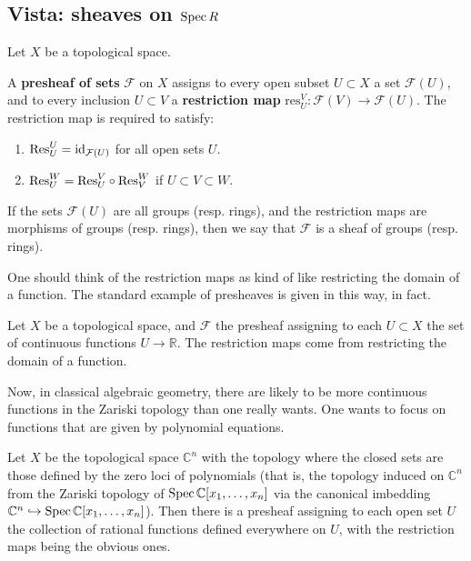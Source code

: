 \subsection{Vista: sheaves on $\operatorname{Spec} R$}

Let $X$ be a topological space. 
\begin{definition} 
A \textbf{presheaf of sets} $\mathcal{F}$ on $X$ assigns to every open subset
$U \subset X$ a set $\mathcal{F} (U)$, and to every inclusion $U \subset V$ a
\textbf{restriction map}
$\mathrm{res}^V_U : \mathcal{F}(V) \to \mathcal{F}(U)$. The restriction map is
required to satisfy:
\begin{enumerate}
\item $\mathrm{Res}^U_U = \operatorname{id}_{\mathcal{F}(U)} $ for all open sets $U$.
\item $\mathrm{Res}^W_U = \mathrm{Res}^V_U \circ \mathrm{Res}^W_V $ if $U \subset V \subset W$.
\end{enumerate}

If the sets $\mathcal{F}(U)$ are all groups (resp. rings), and the restriction
maps are morphisms of groups (resp. rings), then we say that $\mathcal{F}$ is a
sheaf of groups (resp. rings).
\end{definition} 


One should think of the restriction maps as kind of like restricting the
domain of a function.
The standard example of presheaves is given in this way, in fact.
\begin{example} 
Let $X$ be a topological space, and $\mathcal{F}$ the presheaf assigning to
each $U \subset X$ the set of continuous functions $U \to \mathbb{R}$. The
restriction maps come from restricting the domain of a function.
\end{example} 

Now, in classical algebraic geometry, there are likely to be more
continuous functions in the Zariski topology than one really wants. One wants
to focus on functions that are given by polynomial equations.

\begin{example} 
Let $X$ be the topological space $\mathbb{C}^n$ with the topology where the
closed sets are those defined by the zero loci of polynomials (that is, the
topology induced on $\mathbb{C}^n$ from the Zariski topology of $\operatorname{Spec}
\mathbb{C}[x_1, \dots, x_n]$ via the canonical imbedding $\mathbb{C}^n
\hookrightarrow \operatorname{Spec} \mathbb{C}[x_1, \dots, x_n]$). Then there is a presheaf
assigning to each open set $U$ the collection of rational functions defined
everywhere on $U$, with the  restriction maps being the obvious ones.
\end{example} 

